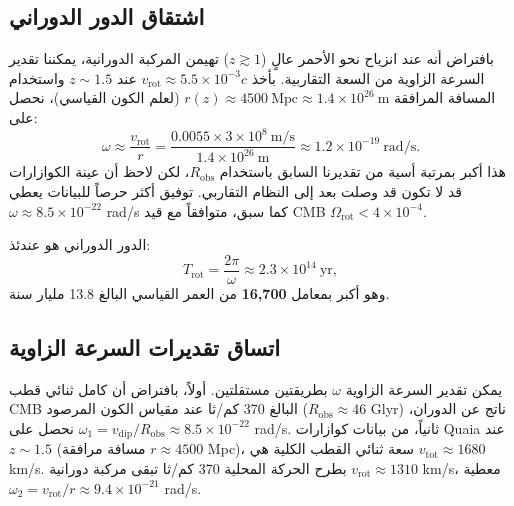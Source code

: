 \documentclass[12pt,a4paper]{article}
\newcommand{\Omegarot}{\Omega_{\mathrm{rot}}}
\begin{document}
	\subsection{اشتقاق الدور الدوراني}
	
	بافتراض أنه عند انزياح نحو الأحمر عالٍ (\(z\gtrsim1\)) تهيمن المركبة الدورانية، يمكننا تقدير السرعة الزاوية من السعة التقاربية. بأخذ \(v_{\text{rot}} \approx 5.5\times10^{-3}c\) عند \(z\sim1.5\) واستخدام المسافة المرافقة \(r(z) \approx 4500\ \text{Mpc} \approx 1.4\times10^{26}\ \text{m}\) (لعلم الكون القياسي)، نحصل على:
	\begin{equation}
		\omega \approx \frac{v_{\text{rot}}}{r} = \frac{0.0055 \times 3\times10^8\ \text{m/s}}{1.4\times10^{26}\ \text{m}} \approx 1.2\times10^{-19}\ \text{rad/s}.
	\end{equation}
	هذا أكبر بمرتبة أسية من تقديرنا السابق باستخدام \(R_{\text{obs}}\)، لكن لاحظ أن عينة الكوازارات قد لا تكون قد وصلت بعد إلى النظام التقاربي. توفيق أكثر حرصاً للبيانات يعطي \(\omega \approx 8.5\times10^{-22}\) rad/s كما سبق، متوافقاً مع قيد CMB \(\Omegarot < 4\times10^{-4}\).
	
	الدور الدوراني هو عندئذ:
	\begin{equation}
		T_{\text{rot}} = \frac{2\pi}{\omega} \approx 2.3 \times 10^{14}\ \text{yr},
	\end{equation}
	وهو أكبر بمعامل \textbf{16,700} من العمر القياسي البالغ 13.8 مليار سنة.
	
	\subsection{اتساق تقديرات السرعة الزاوية}
	
	يمكن تقدير السرعة الزاوية \(\omega\) بطريقتين مستقلتين. أولاً، بافتراض أن كامل ثنائي قطب CMB البالغ 370 كم/ثا عند مقياس الكون المرصود (\(R_{\text{obs}} \approx 46\) Glyr) ناتج عن الدوران، نحصل على \(\omega_1 = v_{\text{dip}}/R_{\text{obs}} \approx 8.5\times10^{-22}\) rad/s. ثانياً، من بيانات كوازارات Quaia عند \(z\sim1.5\) (مسافة مرافقة \(r \approx 4500\) Mpc)، سعة ثنائي القطب الكلية هي \(v_{\text{tot}} \approx 1680\) km/s. بطرح الحركة المحلية 370 كم/ثا تبقى مركبة دورانية \(v_{\text{rot}} \approx 1310\) km/s، معطية \(\omega_2 = v_{\text{rot}}/r \approx 9.4\times10^{-21}\) rad/s.
	
\end{document}

